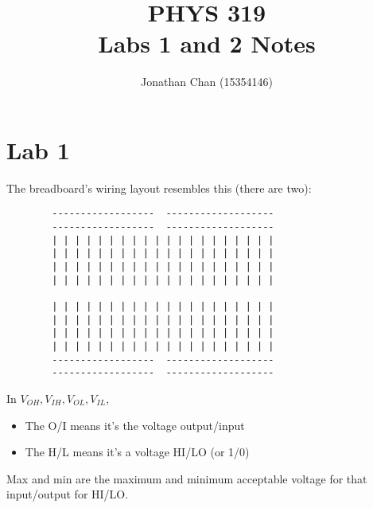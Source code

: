\documentclass[11pt]{article}
\author{Jonathan Chan (15354146)}
\title{PHYS 319\\Labs 1 and 2 Notes}
\begin{document}
	\maketitle
	
	\section{Lab 1}
		The breadboard's wiring layout resembles this (there are two):
	\begin{verbatim}
		------------------  -------------------
		------------------  -------------------
		| | | | | | | | | | | | | | | | | | | |
		| | | | | | | | | | | | | | | | | | | |
		| | | | | | | | | | | | | | | | | | | |
		| | | | | | | | | | | | | | | | | | | |
		
		| | | | | | | | | | | | | | | | | | | |
		| | | | | | | | | | | | | | | | | | | |
		| | | | | | | | | | | | | | | | | | | |
		| | | | | | | | | | | | | | | | | | | |
		------------------  -------------------
		------------------  -------------------
	\end{verbatim}
		In $V_{OH}, V_{IH}, V_{OL}, V_{IL}$, 
	\begin{itemize}
		\item The O/I means it's the voltage output/input
		\item The H/L means it's a voltage HI/LO (or 1/0)
	\end{itemize}
		Max and min are the maximum and minimum acceptable voltage for that input/output for HI/LO.
	
\end{document}

